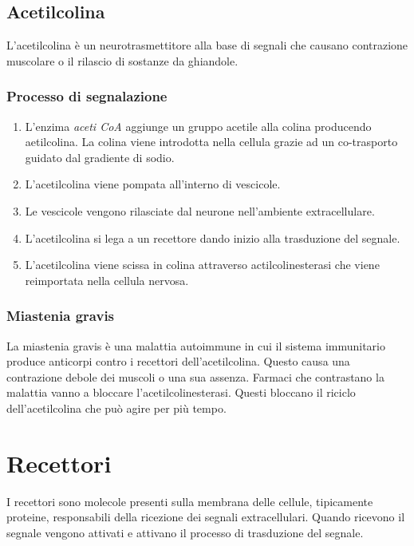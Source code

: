 	\subsection{Acetilcolina}
	L'acetilcolina \`e un neurotrasmettitore alla base di segnali che causano contrazione muscolare o il rilascio di sostanze da ghiandole.

		\subsubsection{Processo di segnalazione}
		\begin{multicols}{2}
			\begin{enumerate}
				\item L'enzima \emph{aceti CoA} aggiunge un gruppo acetile alla colina producendo aetilcolina.
					La colina viene introdotta nella cellula grazie ad un co-trasporto guidato dal gradiente di sodio.
				\item L'acetilcolina viene pompata all'interno di vescicole.
				\item Le vescicole vengono rilasciate dal neurone nell'ambiente extracellulare.
				\item L'acetilcolina si lega a un recettore dando inizio alla trasduzione del segnale.
				\item L'acetilcolina viene scissa in colina attraverso actilcolinesterasi che viene reimportata nella cellula nervosa.
			\end{enumerate}
		\end{multicols}

		\subsubsection{Miastenia gravis}
		La miastenia gravis \`e una malattia autoimmune in cui il sistema immunitario produce anticorpi contro i recettori dell'acetilcolina.
		Questo causa una contrazione debole dei muscoli o una sua assenza.
		Farmaci che contrastano la malattia vanno a bloccare l'acetilcolinesterasi.
		Questi bloccano il riciclo dell'acetilcolina che pu\`o agire per pi\`u tempo.

\section{Recettori}
I  recettori sono molecole presenti sulla membrana delle cellule, tipicamente proteine, responsabili della ricezione dei segnali extracellulari.
Quando ricevono il segnale vengono attivati e attivano il processo di trasduzione del segnale.

